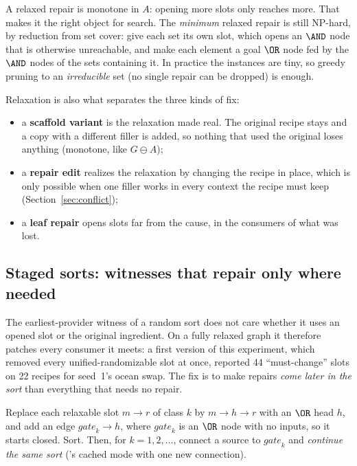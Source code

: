 A relaxed repair is monotone in $A$: opening more slots only reaches more. That makes it the right object for search. The \emph{minimum} relaxed repair is still NP-hard, by reduction from set cover: give each set its own slot, which opens an $\AND$ node that is otherwise unreachable, and make each element a goal $\OR$ node fed by the $\AND$ nodes of the sets containing it. In practice the instances are tiny, so greedy pruning to an \emph{irreducible} set (no single repair can be dropped) is enough.

Relaxation is also what separates the three kinds of fix:
\begin{itemize}[nosep]
\item a \textbf{scaffold variant} is the relaxation made real. The original recipe stays and a copy with a different filler is added, so nothing that used the original loses anything (monotone, like $G\ominus A$);
\item a \textbf{repair edit} realizes the relaxation by changing the recipe in place, which is only possible when one filler works in every context the recipe must keep (Section~\ref{sec:conflict});
\item a \textbf{leaf repair} opens slots far from the cause, in the consumers of what was lost.
\end{itemize}

\subsection{Staged sorts: witnesses that repair only where needed}\label{sec:staged}

The earliest-provider witness of a random sort does not care whether it uses an opened slot or the original ingredient. On a fully relaxed graph it therefore patches every consumer it meets: a first version of this experiment, which removed every unified-randomizable slot at once, reported 44 ``must-change'' slots on 22 recipes for seed~1's ocean swap. The fix is to make repairs \emph{come later in the sort} than everything that needs no repair.

\begin{definition}
Replace each relaxable slot $m\to r$ of class $k$ by $m\to h\to r$ with an $\OR$ head $h$, and add an edge $\mathit{gate}_k\to h$, where $\mathit{gate}_k$ is an $\OR$ node with no inputs, so it starts closed. Sort. Then, for $k=1,2,\dots$, connect a source to $\mathit{gate}_k$ and \emph{continue the same sort} ('s cached mode with one new connection).
\end{definition}

